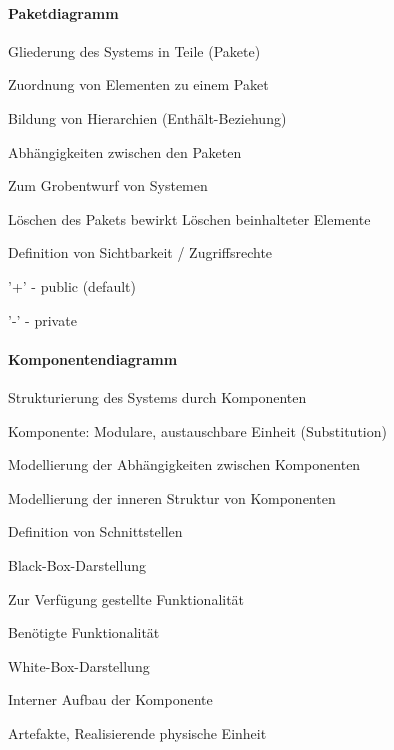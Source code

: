 \documentclass[a4paper]{article}
\begin{document}
\begin{multicols}{3}
  \paragraph{Paketdiagramm}
  \begin{itemize*}
    \item Gliederung des Systems in Teile (Pakete)
    \item Zuordnung von Elementen zu einem Paket
    \item Bildung von Hierarchien (Enthält-Beziehung)
    \item Abhängigkeiten zwischen den Paketen
    \item Zum Grobentwurf von Systemen
    \item Löschen des Pakets bewirkt Löschen beinhalteter Elemente
    \item Definition von Sichtbarkeit / Zugriffsrechte
    \begin{itemize*}
      \item '+' - public (default)
      \item '-' - private
    \end{itemize*}
  \end{itemize*}

  \paragraph{Komponentendiagramm}
  \begin{itemize*}
    \item Strukturierung des Systems durch Komponenten
    \item Komponente: Modulare, austauschbare Einheit (Substitution)
    \item Modellierung der Abhängigkeiten zwischen Komponenten
    \item Modellierung der inneren Struktur von Komponenten
    \item Definition von Schnittstellen
    \item Black-Box-Darstellung
    \begin{itemize*}
      \item Zur Verfügung gestellte Funktionalität
      \item Benötigte Funktionalität
    \end{itemize*}
    \item White-Box-Darstellung
    \begin{itemize*}
      \item Interner Aufbau der Komponente
      \item Artefakte‚ Realisierende physische Einheit
    \end{itemize*}
  \end{itemize*}


\end{multicols}
\end{document}
